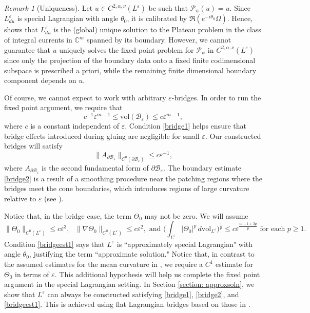 \documentclass[11pt]{amsart}
\theoremstyle{definition}
\theoremstyle{remark}
\newtheorem{remark}{Remark}
\newcommand{\C}{\mathbb{C}}
\newcommand{\vol}{\mathrm{vol}}
\begin{document}
\begin{remark}[Uniqueness]
    Let $u \in C^{2,\alpha,\nu}(L^\varepsilon)$ be such that $\mathcal{P}_\psi(u)=u$. Since $L_{du}^\varepsilon$ is special Lagrangian with angle $\theta_0$, it is calibrated by $\Re(e^{-i\theta_0}\Omega)$. Hence, \cite[Theorem 1.2]{DL225} shows that $L_{du}^\varepsilon$ is the (global) unique solution to the Plateau problem in the class of integral currents in $\C^m$ spanned by its boundary. However, we cannot guarantee that $u$ uniquely solves the fixed point problem for $\mathcal{P}_\psi$ in $C^{2,\alpha,\nu}(L^\varepsilon)$ since only the projection of the boundary data onto a fixed finite codimensional subspace is prescribed a priori, while the remaining finite dimensional boundary component depends on $u$.
\end{remark}

Of course, we cannot expect to work with arbitrary $\varepsilon$-bridges. In order to run the fixed point argument, we require that
\begin{equation}
        c^{-1}\varepsilon^{m-1} \leq \vol (\mathscr{B}_\varepsilon) \leq c \varepsilon^{m-1}, \label{bridge1}
\end{equation}
where $c$ is a constant independent of $\varepsilon$. Condition \eqref{bridge1} helps ensure that bridge effects introduced during gluing are negligible for small $\varepsilon$. Our constructed bridges will satisfy
\begin{equation}
    \|A_{\partial \mathscr{B}_\varepsilon}\|_{C^0(\partial \mathscr{B}_\varepsilon)} \leq c\varepsilon^{-1}, \label{bridge2}
\end{equation}
where $A_{\partial \mathscr{B}_\varepsilon}$ is the second fundamental form of $\partial \mathscr{B}_\varepsilon$. The boundary estimate \eqref{bridge2} is a result of a smoothing procedure near the patching regions where the bridges meet the cone boundaries, which introduces regions of large curvature relative to $\varepsilon$ (see \cite[Section 2]{Sm87}). 


Notice that, in the bridge case, the term $\Theta_0$ may not be zero. We will assume 
\begin{equation}
    \|\Theta_0\|_{C^0(L^\varepsilon)} \leq c \varepsilon^3, \text{ } \|\nabla \Theta_0\|_{C^0(L^\varepsilon)} \leq c\varepsilon^2, \text{ and }  \Big(\int_{L^\varepsilon} |\Theta_0|^{p} \, d\vol_{L^\varepsilon}\Big)^{\frac{1}{p}} \leq c \varepsilon^{\frac{m - 1 + 3p}{p}} \text{ for each } p \geq 1.\label{bridgeest1}
\end{equation}
Condition \eqref{bridgeest1} says that $L^\varepsilon$ is ``approximately special Lagrangian" with angle $\theta_0$, justifying the term ``approximate solution." Notice that, in contrast to the assumed estimates for the mean curvature in \cite{Sm89, Sm93}, we require a $C^1$ estimate for $\Theta_0$ in terms of $\varepsilon$. This additional hypothesis will help us complete the fixed point argument in the special Lagrangian setting. In Section \ref{section: approxsoln}, we show that $L^\varepsilon$ can always be constructed satisfying \eqref{bridge1}, \eqref{bridge2}, and \eqref{bridgeest1}. This is achieved using flat Lagrangian bridges based on those in \cite[Section 7.2]{Dim25}.
\end{document}
